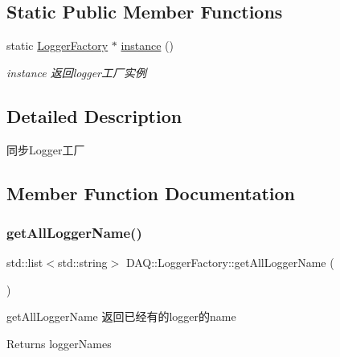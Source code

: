 \subsection*{Static Public Member Functions}
\begin{DoxyCompactItemize}
\item 
static \hyperlink{classDAQ_1_1LoggerFactory}{Logger\+Factory} $\ast$ \hyperlink{classDAQ_1_1LoggerFactory_a02b883181a962128f9ba0bc53932e5f4}{instance} ()
\begin{DoxyCompactList}\small\item\em instance 返回logger工厂实例 \end{DoxyCompactList}\end{DoxyCompactItemize}


\subsection{Detailed Description}
同步\+Logger工厂 

\subsection{Member Function Documentation}
\mbox{\label{classDAQ_1_1LoggerFactory_ae16677d1422753e2c4b51ea86d398737}} 
\subsubsection{\texorpdfstring{get\+All\+Logger\+Name()}{getAllLoggerName()}}
{\footnotesize\ttfamily std\+::list$<$std\+::string$>$ D\+A\+Q\+::\+Logger\+Factory\+::get\+All\+Logger\+Name (\begin{DoxyParamCaption}{ }\end{DoxyParamCaption})}



get\+All\+Logger\+Name 返回已经有的logger的name 

\begin{DoxyReturn}{Returns}
logger\+Names 
\end{DoxyReturn}
\mbox{\label{classDAQ_1_1LoggerFactory_a49615c743e047dfbc218bd5c272c0025}} 

